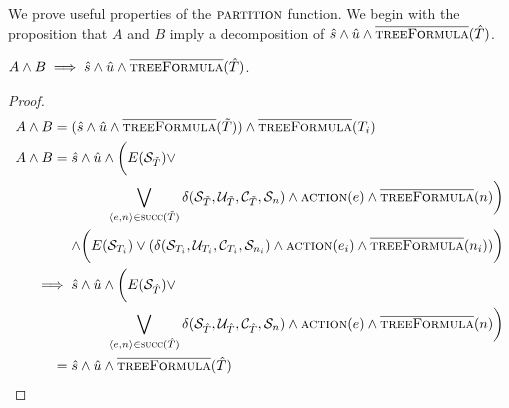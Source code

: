 We prove useful properties of the $\textsc{partition}$ function. We begin with the proposition that $A$ and $B$ imply a decomposition of $\hat{s} \land \hat{u} \land \textsc{$\overline{\mbox{treeFormula}}$}(\hat{T})$. 
\begin{proposition}\label{prop:aandb}
    $A\land B \implies \hat{s} \land \hat{u} \land \textsc{$\overline{\mbox{treeFormula}}$}(\hat{T})$.
\end{proposition}
\begin{proof}
    \begin{align*}
        A \land B ={}& (\hat{s} \land \hat{u} \land \opptf(\tilde{T})) \land \opptf(T_i) \\
        A \land B ={}& \hat{s} \land \hat{u} \land \bigg( E(\mathcal{S}_{\tilde{T}}) \lor \\
                     & \pushright{ \bigvee_{\langle e, n \rangle \in \textsc{succ}(\tilde{T})} \delta(\mathcal{S}_{\tilde{T}}, \mathcal{U}_{\tilde{T}}, \mathcal{C}_{\tilde{T}}, \mathcal{S}_n) \land \textsc{action}(e) \land \opptf(n) \bigg)} \\
                     & \pushright{\land \bigg( E(\mathcal{S}_{T_i}) \lor (\delta(\mathcal{S}_{T_i}, \mathcal{U}_{T_i}, \mathcal{C}_{T_i}, \mathcal{S}_{n_i}) \land \textsc{action}(e_i) \land \opptf(n_i)) \bigg)} \\
        \implies{}& \hat{s} \land \hat{u} \land \bigg( E(\mathcal{S}_{\hat{T}}) \lor \\
                  & \pushright{  \bigvee_{\langle e, n \rangle \in \textsc{succ}(\hat{T})} \delta(\mathcal{S}_{\hat{T}}, \mathcal{U}_{\hat{T}}, \mathcal{C}_{\hat{T}}, \mathcal{S}_n) \land \textsc{action}(e) \land \opptf(n) \bigg)} \\
        ={}& \hat{s} \land \hat{u} \land \opptf(\hat{T})
    \end{align*}
\end{proof}

